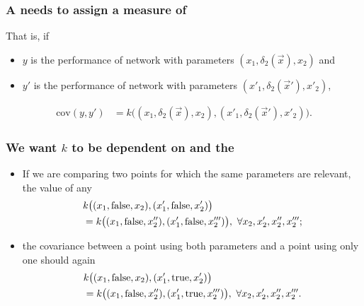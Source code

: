 \documentclass[12pt,onlymath]{beamer}
\begin{document}
\begin{frame}\frametitle{A  needs to assign a measure of }
That is, if 
\begin{itemize}
	\item $y$ is the performance of network with parameters $(x_1, \delta_2(\vec{x}), x_2)$ and
	\item $y'$ is the performance of network with parameters $(x'_1, \delta_2(\vec{x}'), x'_2)$,
\end{itemize}
\begin{align*}
	\text{cov}(y, y') & = k\bigl((x_1, \delta_2(\vec{x}), x_2),(x'_1, \delta_2(\vec{x}'), x'_2)\bigr).
\end{align*}

\end{frame}


\begin{frame}\frametitle{We want $k$ to be dependent on  and the }

%
\begin{itemize}
\item If we are comparing two points for which the same parameters are relevant, the value of any   
\begin{align}
 & k\bigl((x_1, \textnormal{false}, x_2), (x_1', \textnormal{false}, x_2') \bigr) \nonumber\\
& = k\bigl((x_1, \textnormal{false}, x_2''), (x_1', \textnormal{false}, x_2''')\bigr),\ 
\forall x_2, x_2', x_2'', x_2''';
\end{align}
\item the covariance between a point using both parameters and a point using only one should again 
\begin{align}
 & k\bigl((x_1, \textnormal{false}, x_2), (x_1', \textnormal{true}, x_2') \bigr) \nonumber\\
& = k\bigl((x_1, \textnormal{false}, x_2''), (x_1', \textnormal{true}, x_2''')\bigr),\ 
\forall x_2, x_2', x_2'', x_2'''.
\end{align}
\end{itemize}
\end{frame}
\end{document}
